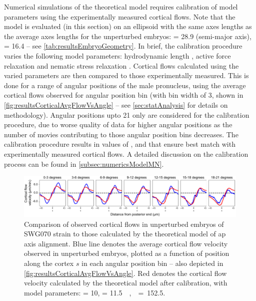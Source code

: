 Numerical simulations of the theoretical model requires calibration of model parameters using the experimentally measured cortical flows. Note that the model is evaluated (in this section) on an ellipsoid with the same axes lengths as the average axes lengths for the unperturbed embryos: \longAxisLength = \SI{28.9}{\unitLength} (semi-major axis), \shortAxisLength = \SI{16.4}{\unitLength} -- see \autoref{tab:resultsEmbryoGeometry}. In brief, the calibration procedure varies the following model parameters: hydrodynamic length \hydrodynamicLength, active force relaxation \activeRelaxLength and nematic stress relaxation \nematicLength. Cortical flows calculated using the varied parameters are then compared to those experimentally measured. This is done for a range of angular positions of the male pronucleus, using the average cortical flows observed for angular position bin (with bin width of \SI{3}{\unitAngle}, shown in \autoref{fig:resultsCorticalAvgFlowVsAngle} -- see \autoref{sec:statAnalysis} for details on methodology). Angular positions upto \SI{21}{\unitAngle} only are considered for the calibration procedure, due to worse quality of data for higher angular positions as the number of movies contributing to those angular position bins decreases. The calibration procedure results in values of \hydrodynamicLength, \activeRelaxLength and \nematicLength that ensure best match with experimentally measured cortical flows. A detailed discussion on the calibration process can be found in \autoref{subsec:numericsModelMN}. 

\begin{figure}
    \centering
    \includegraphics[width=\textwidth]{Results/FigComparePCF/wtCorticalFlowModel.pdf}
    \caption[Calibrating theoretical model using cortical flows observed in unperturbed embryos]{Comparison of observed cortical flows in unperturbed embryos of SWG070 strain to those calculated by the theoretical model of \ac{ap} axis alignment. Blue line denotes the average cortical flow velocity observed in unperturbed embryos, plotted as a function of position along the cortex $s$ in each angular position bin -- also depicted in \autoref{fig:resultsCorticalAvgFlowVsAngle}. Red denotes the cortical flow velocity calculated by the theoretical model after calibration, with model parameters: \hydrodynamicLength = \SI{10}{\unitLength}, \activeRelaxLength = \SI{11.5}{\square\unitLength\per\second}, \nematicLength = \SI{152.5}{\square\unitLength\per\second}.}
    \label{fig:unperturbedModelCalibrationCorticalFlows}
\end{figure}

